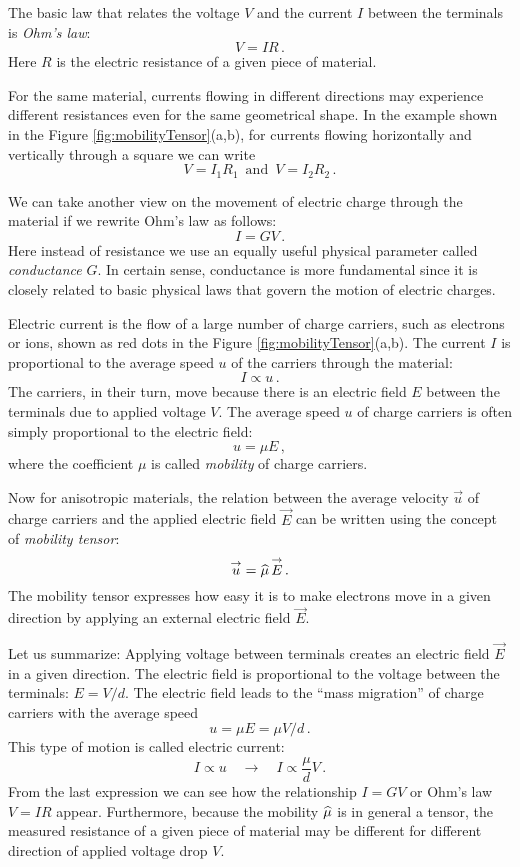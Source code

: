 The basic law that relates the voltage $V$ and the current $I$ between the
terminals is \emph{Ohm's law}:
\[
V = I R\,.
\]
Here $R$ is the electric resistance of a given piece of material.

For the same material, currents flowing in different directions may
experience different resistances even for the same geometrical
shape. In the example shown in the Figure
\ref{fig:mobilityTensor}(a,b), for currents flowing horizontally and
vertically through a square we can write
\[
V = I_1 R_1\,\textrm{ and }\,V = I_2 R_2\,.
\]

We can take another view on the movement of electric charge through the
material if we rewrite Ohm's law as follows:
\[
I = GV\,.
\]
Here instead of resistance we use an equally useful physical parameter
called \emph{conductance} $G$. In certain sense, conductance is more
fundamental since it is closely related to basic physical laws that
govern the motion of electric charges.

Electric current is the flow of a large number of charge carriers, such
as electrons or ions, shown as red dots in the Figure
\ref{fig:mobilityTensor}(a,b). The current $I$ is proportional to the
average speed $u$ of the carriers through the material:
\[
I \propto u\,.
\]
The carriers, in their turn, move because there is an electric field
$E$ between the terminals due to applied voltage $V$. The average
speed $u$ of charge carriers is often simply
proportional to the electric field:
\[
u = \mu E\,,
\]
where the coefficient $\mu$ is called \emph{mobility} of charge carriers.

Now for anisotropic materials, the relation between the average
velocity $\vec{u}$ of charge carriers and the applied electric field
$\vec{E}$ can be written using the concept of \emph{mobility tensor}:
\[
\overset{\rightarrow}{u} = \widehat{\mu}\, \overset{\rightarrow}{E}\,.
\]
The mobility tensor expresses how easy it is to make electrons move in
a given direction by applying an external electric field $\vec{E}$.

Let us summarize: Applying voltage between terminals creates an
electric field $\vec{E}$ in a given direction. The electric field is
proportional to the voltage between the terminals: $E=V/d$. The
electric field leads to the ``mass migration'' of charge carriers with
the average speed
\[
u=\mu E = \mu V/d\,.
\]
This type of motion is called electric current:
\[
I\propto u\quad\longrightarrow\quad I\propto \frac{\mu}{d}V\,.
\]
From the last expression we can see how the relationship $I=GV$ or Ohm's law $V=IR$ appear.
Furthermore, because the mobility $\widehat{\mu}$ is in general a tensor, the
measured resistance of a given piece of material may be different for
different direction of applied voltage drop $V$.

